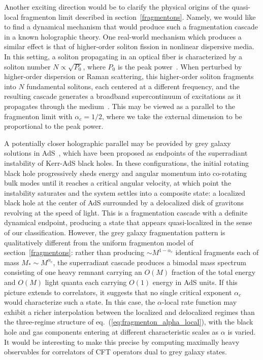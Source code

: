 \documentclass[a4paper,11pt]{article}
\theoremstyle{plain}
\theoremstyle{definition}
\theoremstyle{remark}
\begin{document}
Another exciting direction would be to clarify the physical origins of the quasi-local fragmenton limit described in section~\ref{fragmentons}. Namely, we would like to find a dynamical mechanism that would produce such a fragmentation cascade in a known holographic theory. One real-world mechanism which produces a similar effect is that of higher-order soliton fission in nonlinear dispersive media. In this setting, a soliton propagating in an optical fiber is characterized by a soliton number $N \propto \sqrt{P_0}$, where $P_0$ is the peak power~\cite{Agrawal:2019nfo,Dudley:2006rmp}. When perturbed by higher-order dispersion or Raman scattering, this higher-order soliton fragments into $N$ fundamental solitons, each centered at a different frequency, and the resulting cascade generates a broadband supercontinuum of excitations as it propagates through the medium~\cite{Herrmann:2001prl,Husakou:2002josab}. This may be viewed as a parallel to the fragmenton limit with $\alpha_c = 1/2$, where we take the external dimension to be proportional to the peak power. 

A potentially closer holographic parallel may be provided by grey galaxy solutions in AdS~\cite{Kim:2023sig,Bajaj:2024utv}, which have been proposed as endpoints of the superradiant instability of Kerr-AdS black holes. In these configurations, the initial rotating black hole progressively sheds energy and angular momentum into co-rotating bulk modes until it reaches a critical angular velocity, at which point the instability saturates and the system settles into a composite state: a localized black hole at the center of AdS surrounded by a delocalized disk of gravitons revolving at the speed of light. This is a fragmentation cascade with a definite dynamical endpoint, producing a state that appears quasi-localized in the sense of our classification. However, the grey galaxy fragmentation pattern is qualitatively different from the uniform fragmenton model of section~\ref{fragmentons}: rather than producing $\sim M^{1-\alpha_c}$ identical fragments each of mass $M_* \sim M^{\alpha_c}$, the superradiant cascade produces a bimodal mass spectrum consisting of one heavy remnant carrying an $O(M)$ fraction of the total energy and $O(M)$ light quanta each carrying $O(1)$ energy in AdS units. If this picture extends to correlators, it suggests that no single critical exponent $\alpha_c$ would characterize such a state. In this case, the $\alpha$-local rate function may exhibit a richer interpolation between the localized and delocalized regimes than the three-regime structure of eq.~(\ref{eq:fragmenton_alpha_local}), with the black hole and gas components entering at different characteristic scales as $\alpha$ is varied. It would be interesting to make this precise by computing maximally heavy observables for correlators of CFT operators dual to grey galaxy states. 
\end{document}
